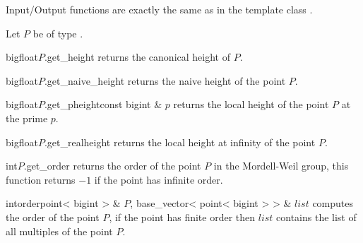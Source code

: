 
\IO

Input/Output functions are exactly the same as in the template class .



\HIGH

Let $P$ be of type .

\begin{fcode}{bigfloat}{$P$.get_height}{}
  returns the canonical height of $P$.
\end{fcode}

\begin{fcode}{bigfloat}{$P$.get_naive_height}{}
  returns the naive height of the point $P$.
\end{fcode}

\begin{fcode}{bigfloat}{$P$.get_pheight}{const bigint & $p$}
  returns the local height of the point $P$ at the prime $p$.
\end{fcode}

\begin{fcode}{bigfloat}{$P$.get_realheight}{}
  returns the local height at infinity of the point $P$.
\end{fcode}

\begin{fcode}{int}{$P$.get_order}{}
  returns the order of the point $P$ in the Mordell-Weil group, this function returns $-1$ if
  the point has infinite order.
\end{fcode}

\begin{fcode}{int}{order}{point< bigint > & $P$, base_vector< point< bigint > > & $\mathit{list}$}
  computes the order of the point $P$, if the point has finite order then $\mathit{list}$
  contains the list of all multiples of the point $P$.
\end{fcode}



\EXAMPLES

